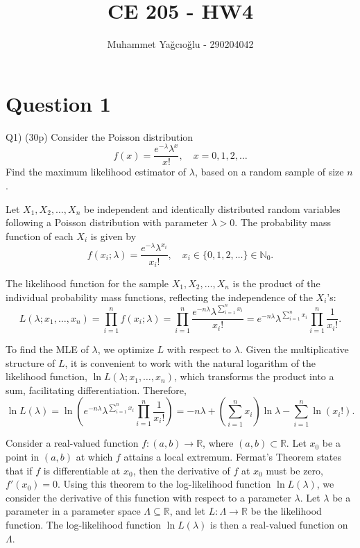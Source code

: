 \documentclass[12pt]{article}
\title{\vspace{-1cm}CE 205 - HW4}
\author{Muhammet Yağcıoğlu - 290204042}
\begin{document}
\maketitle\thispagestyle{fancy}
\pagestyle{fancy}
\tableofcontents
\newpage
\section*{Question 1}
\begin{q}
Q1) (30p) Consider the Poisson distribution
\[
f(x)=\frac{e^{-\lambda} \lambda^x}{x !}, \quad x=0,1,2, \ldots
\]
Find the maximum likelihood estimator of \(\lambda\), based on a random sample of size \(n\).
\end{q}

Let \( X_1, X_2, \ldots, X_n \) be independent and identically distributed random variables following a Poisson distribution with parameter \(\lambda > 0\). The probability mass function of each \(X_i\) is given by
\[ f(x_i; \lambda) = \frac{e^{-\lambda} \lambda^{x_i}}{x_i!}, \quad x_i \in \{0, 1, 2, \ldots\} \in \mathbb{N}_0. \]

The likelihood function for the sample \(X_1, X_2, \ldots, X_n\) is the product of the individual probability mass functions, reflecting the independence of the \(X_i\)'s:
\[ L(\lambda; x_1, \ldots, x_n) = \displaystyle\prod_{i=1}^n f(x_i; \lambda) = \displaystyle\prod_{i=1}^n \frac{e^{-n\lambda} \lambda^{\sum_{i=1}^n x_i}}{x_i!} = e^{-n\lambda} \lambda^{\sum_{i=1}^n x_i} \displaystyle\prod_{i=1}^n \frac{1}{x_i!}. \]

To find the MLE of \(\lambda\), we optimize \(L\) with respect to \(\lambda\). Given the multiplicative structure of \(L\), it is convenient to work with the natural logarithm of the likelihood function, \(\ln L(\lambda; x_1, \ldots, x_n)\), which transforms the product into a sum, facilitating differentiation. Therefore, 
\[ \ln L(\lambda) = \ln \left( e^{-n\lambda} \lambda^{\sum_{i=1}^n x_i} \displaystyle\prod_{i=1}^n \frac{1}{x_i!} \right) = -n\lambda + \left( \sum_{i=1}^n x_i \right) \ln \lambda - \sum_{i=1}^n \ln(x_i!). \]

Consider a real-valued function \( f : (a, b) \to \mathbb{R} \), where \( (a, b) \subset \mathbb{R} \). Let \( x_0 \) be a point in \( (a, b) \) at which \( f \) attains a local extremum. Fermat's Theorem states that if \( f \) is differentiable at \( x_0 \), then the derivative of \( f \) at \( x_0 \) must be zero, \( f'(x_0) = 0 \). Using this theorem to the log-likelihood function \( \ln L(\lambda) \), we consider the derivative of this function with respect to a parameter \( \lambda \). Let \( \lambda \) be a parameter in a parameter space \( \Lambda \subseteq \mathbb{R} \), and let \( L : \Lambda \to \mathbb{R} \) be the likelihood function. The log-likelihood function \( \ln L(\lambda) \) is then a real-valued function on \( \Lambda \). 
\end{document}
